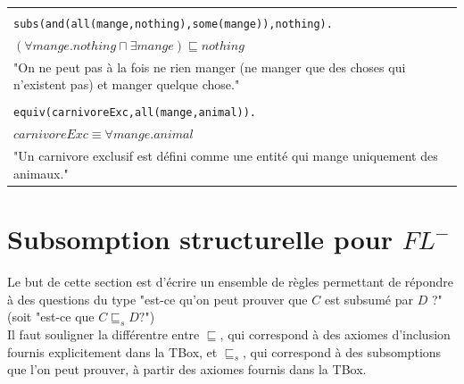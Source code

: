 \documentclass[a4paper,12pt]{report}
\begin{document}
\begin{tcolorbox}[colback=gray!10, colframe=blue!30, coltitle=black, title=Réponse à l'exercice 1 - 1/1]
\begin{table}[H]
\begin{tabularx}{\textwidth}{|Y|}
            \hline \\[-0.4cm]
            \texttt{subs(and(all(mange,nothing),some(mange)),nothing).} \\[0.3cm]
            \((\forall mange.nothing \sqcap \exists mange) \sqsubseteq nothing\) \\[0.3cm]
            "On ne peut pas à la fois ne rien manger (ne manger que des choses qui n'existent pas) et manger quelque chose." \\[0.1cm]
            \hline

            \hline \\[-0.4cm]
            \texttt{equiv(carnivoreExc,all(mange,animal)).} \\[0.3cm]
            \(carnivoreExc \equiv \forall mange.animal\) \\[0.3cm]
            "Un carnivore exclusif est défini comme une entité qui mange uniquement des animaux." \\[0.1cm]
            \hline
            
        \end{tabularx}
    \end{table}

\end{tcolorbox}






\newpage

\chapter*{Subsomption structurelle pour \(FL^-\)}

Le but de cette section est d'écrire un ensemble de règles permettant de répondre à des questions du type "est-ce qu'on peut prouver que \(C\) est
    subsumé par \(D\) ?" (soit "est-ce que \(C \sqsubseteq_s D ?\)")\\

Il faut souligner la différentre entre \(\sqsubseteq\), qui correspond à des axiomes d'inclusion fournis explicitement dans la TBox, et \(\sqsubseteq_s\),
    qui correspond à des subsomptions que l'on peut prouver, à partir des axiomes fournis dans la TBox.
\end{document}
